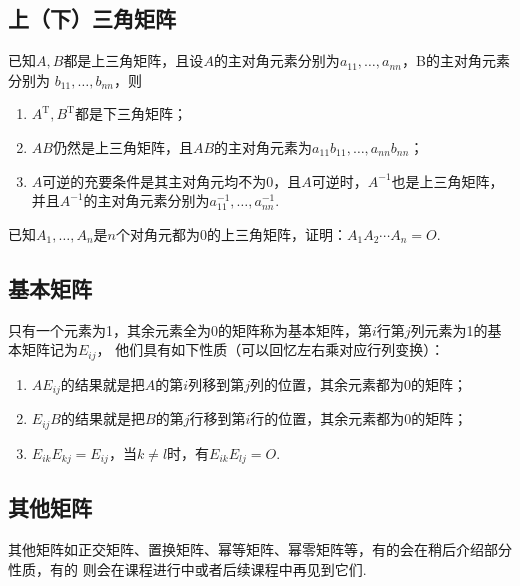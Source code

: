 \subsection{上（下）三角矩阵}
\begin{theorem}
    已知$A,B$都是上三角矩阵，且设$A$的主对角元素分别为$a_{11},\ldots,a_{nn}$，B的主对角元素分别为
    $b_{11},\ldots,b_{nn}$，则
    \begin{enumerate}
        \item $A^{\mathrm{T}}, B^\mathrm{T}$都是下三角矩阵；

        \item $AB$仍然是上三角矩阵，且$AB$的主对角元素为$a_{11}b_{11},\ldots,a_{nn}b_{nn}$；

        \item $A$可逆的充要条件是其主对角元均不为0，且$A$可逆时，$A^{-1}$也是上三角矩阵，并且$A^{-1}$的主对角元素分别为$a_{11}^{-1},\ldots,a_{nn}^{-1}$.
    \end{enumerate}
\end{theorem}

\begin{example}
    已知$A_1,\ldots,A_n$是$n$个对角元都为0的上三角矩阵，证明：$A_1A_2\cdots A_n=O$.
\end{example}

\subsection{基本矩阵}
只有一个元素为1，其余元素全为0的矩阵称为基本矩阵，第$i$行第$j$列元素为1的基本矩阵记为$E_{ij}$，
他们具有如下性质（可以回忆左右乘对应行列变换）：
\begin{theorem}
    \begin{enumerate}
        \item $AE_{ij}$的结果就是把$A$的第$i$列移到第$j$列的位置，其余元素都为0的矩阵；

        \item $E_{ij}B$的结果就是把$B$的第$j$行移到第$i$行的位置，其余元素都为0的矩阵；

        \item $E_{ik}E_{kj}=E_{ij}$，当$k \neq l$时，有$E_{ik}E_{lj}=O$.
    \end{enumerate}
\end{theorem}

\subsection{其他矩阵}
其他矩阵如正交矩阵、置换矩阵、幂等矩阵、幂零矩阵等，有的会在稍后介绍部分性质，有的
则会在课程进行中或者后续课程中再见到它们.

